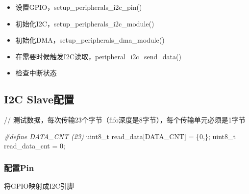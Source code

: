 \documentclass[
  12pt,
]{book}
\newenvironment{Shaded}{\begin{snugshade}}{\end{snugshade}}
\newcommand{\DataTypeTok}[1]{\textcolor[rgb]{0.13,0.29,0.53}{#1}}
\newcommand{\DecValTok}[1]{\textcolor[rgb]{0.00,0.00,0.81}{#1}}
\newcommand{\NormalTok}[1]{#1}
\newcommand{\PreprocessorTok}[1]{\textcolor[rgb]{0.56,0.35,0.01}{\textit{#1}}}
\providecommand{\tightlist}{%
  \setlength{\itemsep}{0pt}\setlength{\parskip}{0pt}}
\begin{document}
\begin{itemize}
\tightlist
\item
  设置GPIO，setup\_peripherals\_i2c\_pin()
\item
  初始化I2C，setup\_peripherals\_i2c\_module()
\item
  初始化DMA，setup\_peripherals\_dma\_module()
\item
  在需要时候触发I2C读取，peripheral\_i2c\_send\_data()
\item
  检查中断状态
\end{itemize}

\hypertarget{i2c-slaveux914dux7f6e-3}{%
\subsection{I2C Slave配置}\label{i2c-slaveux914dux7f6e-3}}

// 测试数据，每次传输23个字节（fifo深度是8字节），每个传输单元必须是1字节

\begin{Shaded}
\begin{Highlighting}[]
\PreprocessorTok{#define DATA_CNT (23)}
\DataTypeTok{uint8_t}\NormalTok{ read_data[DATA_CNT] = \{}\DecValTok{0}\NormalTok{,\};}
\DataTypeTok{uint8_t}\NormalTok{ read_data_cnt = }\DecValTok{0}\NormalTok{;}
\end{Highlighting}
\end{Shaded}

\hypertarget{ux914dux7f6epin-7}{%
\subsubsection{配置Pin}\label{ux914dux7f6epin-7}}

将GPIO映射成I2C引脚
\end{document}
